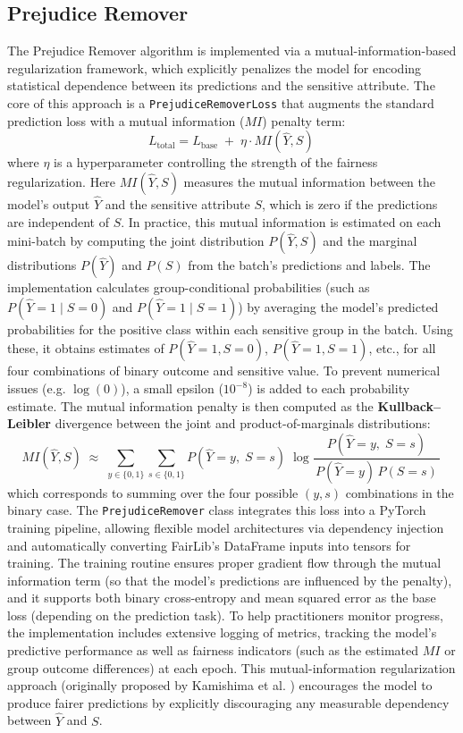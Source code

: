 \documentclass[12pt,a4paper,openright,twoside]{book}
\begin{document}
\subsection{Prejudice Remover}
The Prejudice Remover algorithm is implemented via a mutual-information-based regularization framework, which explicitly penalizes the model for encoding statistical dependence between its predictions and the sensitive attribute. The core of this approach is a \texttt{PrejudiceRemoverLoss} that augments the standard prediction loss with a mutual information ($MI$) penalty term:
\begin{equation}
    L_{\text{total}} = L_{\text{base}} \;+\; \eta \cdot MI(\hat{Y}, S)\,
\end{equation}
where $\eta$ is a hyperparameter controlling the strength of the fairness regularization. Here $MI(\hat{Y}, S)$ measures the mutual information between the model’s output $\hat{Y}$ and the sensitive attribute $S$, which is zero if the predictions are independent of $S$. In practice, this mutual information is estimated on each mini-batch by computing the joint distribution $P(\hat{Y}, S)$ and the marginal distributions $P(\hat{Y})$ and $P(S)$ from the batch’s predictions and labels. The implementation calculates group-conditional probabilities (such as $P(\hat{Y}=1 \mid S=0)$ and $P(\hat{Y}=1 \mid S=1)$) by averaging the model’s predicted probabilities for the positive class within each sensitive group in the batch. Using these, it obtains estimates of $P(\hat{Y}=1, S=0)$, $P(\hat{Y}=1, S=1)$, etc., for all four combinations of binary outcome and sensitive value. To prevent numerical issues (e.g. $\log(0)$), a small epsilon ($10^{-8}$) is added to each probability estimate. The mutual information penalty is then computed as the \textbf{Kullback–Leibler} divergence between the joint and product-of-marginals distributions:
\begin{equation}
    MI(\hat{Y}, S) \;\approx\; \sum_{y\in\{0,1\}} \sum_{s\in\{0,1\}} P(\hat{Y}=y,\;S=s)\; \log \frac{P(\hat{Y}=y,\;S=s)}{\,P(\hat{Y}=y)\,P(S=s)\,}\,
\end{equation}
which corresponds to summing over the four possible $(y, s)$ combinations in the binary case. The \texttt{PrejudiceRemover} class integrates this loss into a PyTorch training pipeline, allowing flexible model architectures via dependency injection and automatically converting FairLib’s DataFrame inputs into tensors for training. The training routine ensures proper gradient flow through the mutual information term (so that the model’s predictions are influenced by the penalty), and it supports both binary cross-entropy and mean squared error as the base loss (depending on the prediction task). To help practitioners monitor progress, the implementation includes extensive logging of metrics, tracking the model’s predictive performance as well as fairness indicators (such as the estimated $MI$ or group outcome differences) at each epoch. This mutual-information regularization approach (originally proposed by Kamishima et al. \cite{kamishima2012prejudiceremoverregularizer}) encourages the model to produce fairer predictions by explicitly discouraging any measurable dependency between $\hat{Y}$ and $S$.
\end{document}
